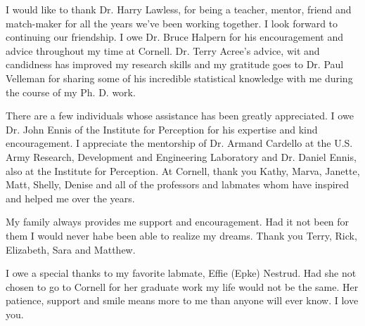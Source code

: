 \documentclass[phd,tocprelim]{cornell}
\begin{document}
\begin{acknowledgements}

I would like to thank Dr. Harry Lawless, for being a teacher, mentor, friend and match-maker for all the years we’ve been working together.  I look forward to continuing our friendship.  I owe Dr. Bruce Halpern for his encouragement and advice throughout my time at Cornell.  Dr. Terry Acree's advice, wit and candidness has improved my research skills and my gratitude goes to Dr. Paul Velleman for sharing some of his incredible statistical knowledge with me during the course of my Ph. D. work.  

There are a few individuals whose assistance has been greatly appreciated.  I owe Dr. John Ennis of the Institute for Perception for his expertise and kind encouragement.  I appreciate the mentorship of Dr. Armand Cardello at the U.S. Army Research, Development and Engineering Laboratory and Dr. Daniel Ennis, also at the Institute for Perception.  At Cornell, thank you Kathy, Marva, Janette, Matt, Shelly, Denise and all of the professors and labmates whom have inspired and helped me over the years.  

My family always provides me support and encouragement.  Had it not been for them I would never habe been able to realize my dreams.  Thank you Terry, Rick, Elizabeth, Sara and Matthew.  

I owe a special thanks to my favorite labmate,  Effie (Epke) Nestrud.  Had she not chosen to go to Cornell for her graduate work my life would not be the same.  Her patience, support and smile means more to me than anyone will ever know.  I love you.

\end{acknowledgements}
\contentspage
{}
\tablelistpage
{}
\figurelistpage

\normalspacing \setcounter{page}{1} 
\pagestyle{cornell} \addtolength{\parskip}{0.5\baselineskip}










\end{document}
